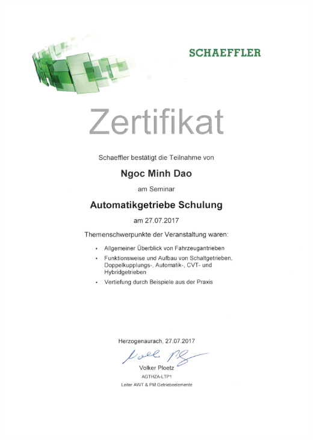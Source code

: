 \documentclass[12pt,a4paper]{scrartcl}
\begin{document}
\newpage
{}
\includegraphics [width=\linewidth, height=\textheight] {./zeugnisse/automatikgetriebe_schulung.jpg}
\end{document}
